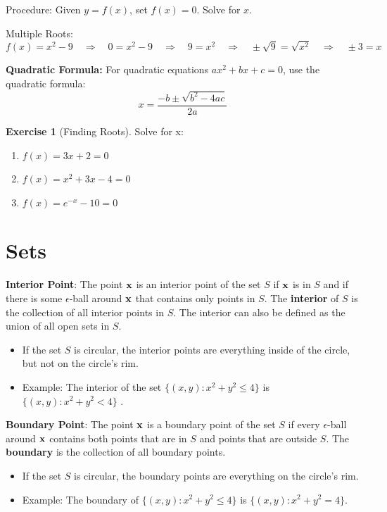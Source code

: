 \documentclass[
]{book}
\providecommand{\tightlist}{%
  \setlength{\itemsep}{0pt}\setlength{\parskip}{0pt}}
\theoremstyle{definition}
\theoremstyle{definition}
\theoremstyle{definition}
\newtheorem{exercise}{Exercise}[chapter]
\theoremstyle{definition}
\theoremstyle{remark}
\begin{document}
Procedure: Given \(y=f(x)\), set \(f(x)=0\). Solve for \(x\).

Multiple Roots:
\[f(x)=x^2 - 9 \quad\Longrightarrow\quad 0=x^2 - 9 \quad\Longrightarrow\quad 9=x^2 \quad\Longrightarrow\quad \pm \sqrt{9}=\sqrt{x^2} \quad\Longrightarrow\quad \pm 3=x\]

\textbf{Quadratic Formula:} For quadratic equations \(ax^2+bx+c=0\), use the quadratic formula: \[x=\frac{-b\pm\sqrt{b^2-4ac}}{2a}\]

\begin{exercise}[Finding Roots]
\protect\hypertarget{exr:solvevar1}{}{\label{exr:solvevar1} {} }
Solve for x:

\begin{enumerate}
\def\labelenumi{\arabic{enumi}.}
\item
  \(f(x)=3x+2 = 0\)
\item
  \(f(x)=x^2+3x-4=0\)
\item
  \(f(x)=e^{-x}-10 = 0\)
\end{enumerate}
\end{exercise}

\hypertarget{sets}{%
\section{Sets}\label{sets}}

\textbf{Interior Point}: The point \(\bf x\) is an interior point of the set \(S\) if \(\bf x\) is in \(S\) and if there is some \(\epsilon\)-ball around \(\bf x\) that contains only points in \(S\). The \textbf{interior} of \(S\) is the collection of all interior points in \(S\). The interior can also be defined as the union of all open sets in \(S\).

\begin{itemize}
\tightlist
\item
  If the set \(S\) is circular, the interior points are everything inside of the circle, but not on the circle's rim.
\item
  Example: The interior of the set \(\{ (x,y) : x^2+y^2\le 4 \}\) is \(\{ (x,y) : x^2+y^2< 4 \}\) .
\end{itemize}

\textbf{Boundary Point}: The point \(\bf x\) is a boundary point of the set \(S\) if every \(\epsilon\)-ball around \(\bf x\) contains both points that are in \(S\) and points that are outside \(S\). The \textbf{boundary} is the collection of all boundary points.

\begin{itemize}
\tightlist
\item
  If the set \(S\) is circular, the boundary points are everything on the circle's rim.
\item
  Example: The boundary of \(\{ (x,y) : x^2+y^2\le 4 \}\) is \(\{ (x,y) : x^2+y^2 = 4 \}\).
\end{itemize}
\end{document}
